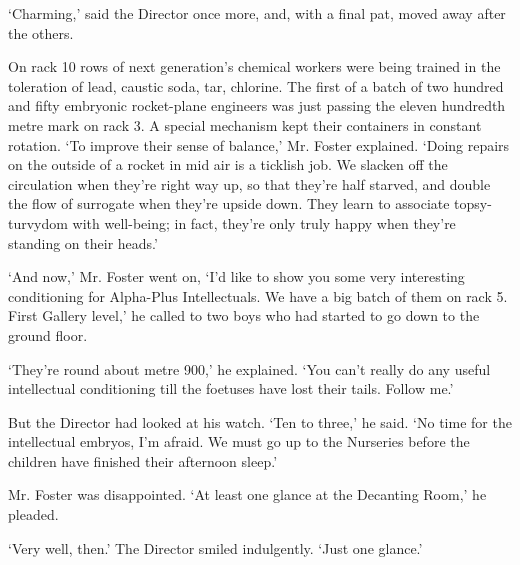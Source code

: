 \documentclass[10pt,a4paper]{article}
\newcommand{\sqm}[1]{‘#1’}
\begin{document}
\sqm{Charming,} said the Director once more, and, with a final pat, moved away after the others.

On rack 10 rows of next generation's chemical workers were being trained in the toleration of lead, caustic soda, tar, chlorine. The first of a batch of two hundred and fifty embryonic rocket-plane engineers was just passing the eleven hundredth metre mark on rack 3. A special mechanism kept their containers in constant rotation. \sqm{To improve their sense of balance,} Mr. Foster explained. \sqm{Doing repairs on the outside of a rocket in mid air is a ticklish job. We slacken off the circulation when they're right way up, so that they're half starved, and double the flow of surrogate when they're upside down. They learn to associate topsy-turvydom with well-being; in fact, they're only truly happy when they're standing on their heads.}

\sqm{And now,} Mr. Foster went on, \sqm{I'd like to show you some very interesting conditioning for Alpha-Plus Intellectuals. We have a big batch of them on rack 5. First Gallery level,} he called to two boys who had started to go down to the ground floor.

\sqm{They're round about metre 900,} he explained. \sqm{You can't really do any useful intellectual conditioning till the foetuses have lost their tails. Follow me.}

But the Director had looked at his watch. \sqm{Ten to three,} he said. \sqm{No time for the intellectual embryos, I'm afraid. We must go up to the Nurseries before the children have finished their afternoon sleep.}

Mr. Foster was disappointed. \sqm{At least one glance at the Decanting Room,} he pleaded.

\sqm{Very well, then.} The Director smiled indulgently. \sqm{Just one glance.}
\end{document}
